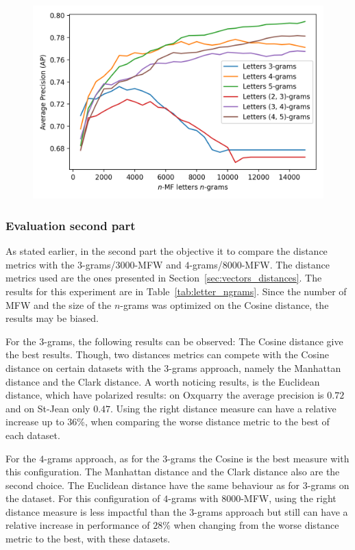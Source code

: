 \begin{figure}
  \label{fig:letter_ngrams_st_jean}
  \includegraphics[width=\linewidth]{img/letter_ngrams_st_jean.png}
\end{figure}

\subsubsection{Evaluation second part}

As stated earlier, in the second part the objective it to compare the distance metrics with the $3$-grams/$3000$-MFW and $4$-grams/$8000$-MFW.
The distance metrics used are the ones presented in Section~\ref{sec:vectors_distances}.
The results for this experiment are in Table~\ref{tab:letter_ngrams}.
Since the number of MFW and the size of the $n$-grams was optimized on the Cosine distance, the results may be biased.

For the $3$-grams, the following results can be observed:
The Cosine distance give the best results.
Though, two distances metrics can compete with the Cosine distance on certain datasets with the $3$-grams approach, namely the Manhattan distance and the Clark distance.
A worth noticing results, is the Euclidean distance, which have polarized results: on Oxquarry the average precision is $0.72$ and on St-Jean only $0.47$.
Using the right distance measure can have a relative increase up to $36$\%, when comparing the worse distance metric to the best of each dataset.

For the $4$-grams approach, as for the $3$-grams the Cosine is the best measure with this configuration.
The Manhattan distance and the Clark distance also are the second choice.
The Euclidean distance have the same behaviour as for $3$-grams on the dataset.
For this configuration of $4$-grams with $8000$-MFW, using the right distance measure is less impactful than the $3$-grams approach but still can have a relative increase in performance of $28$\% when changing from the worse distance metric to the best, with these datasets.

